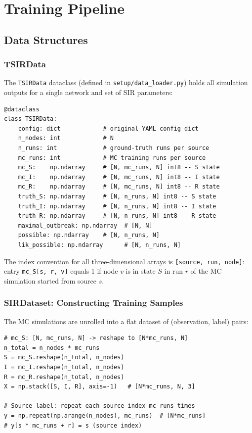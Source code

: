 \documentclass[12pt,a4paper]{report}
\begin{document}
\chapter{Training Pipeline}
\label{chap:training}

\section{Data Structures}

\subsection{TSIRData}

The \texttt{TSIRData} dataclass (defined in \texttt{setup/data\_loader.py}) holds
all simulation outputs for a single network and set of SIR parameters:

\begin{lstlisting}[caption={TSIRData dataclass fields.}]
@dataclass
class TSIRData:
    config: dict            # original YAML config dict
    n_nodes: int            # N
    n_runs: int             # ground-truth runs per source
    mc_runs: int            # MC training runs per source
    mc_S:    np.ndarray     # [N, mc_runs, N] int8 -- S state
    mc_I:    np.ndarray     # [N, mc_runs, N] int8 -- I state
    mc_R:    np.ndarray     # [N, mc_runs, N] int8 -- R state
    truth_S: np.ndarray     # [N, n_runs, N] int8 -- S state
    truth_I: np.ndarray     # [N, n_runs, N] int8 -- I state
    truth_R: np.ndarray     # [N, n_runs, N] int8 -- R state
    maximal_outbreak: np.ndarray  # [N, N]
    possible: np.ndarray    # [N, n_runs, N]
    lik_possible: np.ndarray      # [N, n_runs, N]
\end{lstlisting}

The index convention for all three-dimensional arrays is
\texttt{[source, run, node]}: entry \texttt{mc\_S[s, r, v]} equals 1 if node
$v$ is in state $S$ in run $r$ of the MC simulation started from source $s$.

\subsection{SIRDataset: Constructing Training Samples}

The MC simulations are unrolled into a flat dataset of (observation, label)
pairs:
\begin{lstlisting}[caption={Flattening MC simulations into training samples.}]
# mc_S: [N, mc_runs, N] -> reshape to [N*mc_runs, N]
n_total = n_nodes * mc_runs
S = mc_S.reshape(n_total, n_nodes)
I = mc_I.reshape(n_total, n_nodes)
R = mc_R.reshape(n_total, n_nodes)
X = np.stack([S, I, R], axis=-1)   # [N*mc_runs, N, 3]

# Source label: repeat each source index mc_runs times
y = np.repeat(np.arange(n_nodes), mc_runs)  # [N*mc_runs]
# y[s * mc_runs + r] = s (source index)
\end{lstlisting}
\end{document}
